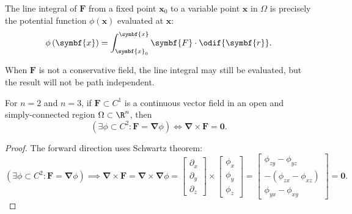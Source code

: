 \documentclass{article}
\begin{document}
\begin{theorem}
    The line integral of \(\symbf{F}\) from a fixed point \(\symbf{x}_0\)
    to a variable point \(\symbf{x}\) in \(\Omega\) is precisely the
    potential function \(\phi\left( \symbf{x} \right)\) evaluated at
    \(\symbf{x}\):
    \begin{equation*}
        \phi\left( \symbf{x} \right) = \int_{\symbf{x}_0}^{\symbf{x}} \symbf{F} \cdot \odif{\symbf{r}}.
    \end{equation*}
\end{theorem}
\begin{remark}
    When \(\symbf{F}\) is not a conservative field, the line integral
    may still be evaluated, but the result will not be path independent.
\end{remark}
\begin{theorem}
    For \(n = 2\) and \(n = 3\), if \(\symbf{F} \subset C^1\) is a
    continuous vector field in an open and simply-connected region
    \(\Omega \subset \R^n\), then
    \begin{equation*}
        \left( \exists \phi \subset C^2 : \symbf{F} = \symbf{\nabla}\phi \right) \iff \symbf{\nabla} \times \symbf{F} = \symbf{0}.
    \end{equation*}
\end{theorem}
\begin{proof}
    The forward direction uses Schwartz theorem:
    \begin{equation*}
        \left( \exists \phi \subset C^2 : \symbf{F} = \symbf{\nabla}\phi \right) \implies \symbf{\nabla} \times \symbf{F} = \symbf{\nabla} \times \symbf{\nabla} \phi =
        \begin{bmatrix}
            \partial_x \\
            \partial_y \\
            \partial_z
        \end{bmatrix}
        \times
        \begin{bmatrix}
            \phi_x \\
            \phi_y \\
            \phi_z
        \end{bmatrix}
        =
        \begin{bmatrix}
            \phi_{zy} - \phi_{yz}                 \\
            -\left( \phi_{zx} - \phi_{xz} \right) \\
            \phi_{yx} - \phi_{xy}
        \end{bmatrix}
        = \symbf{0}.
    \end{equation*}
\end{proof}
\end{document}
